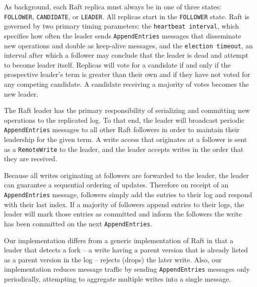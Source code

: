 \documentclass[10pt,conference,letterpaper]{IEEEtran}
\begin{document}
As background, each Raft replica must always be in one of three states: \texttt{FOLLOWER},
\texttt{CANDIDATE}, or \texttt{LEADER}.
All replicas start in the \texttt{FOLLOWER} state.
Raft is governed by two primary timing parameters: the \texttt{heartbeat interval}, which
specifies how often the leader sends \texttt{AppendEntries} messages that disseminate new
operations and double as 
keep-alive messages, and the \texttt{election timeout}, an interval after which a follower
may conclude that the leader is dead and attempt to become leader itself.
Replicas will vote for a candidate if and only if the prospective leader's term is greater
than their own and if they have not voted for any competing candidate.
A candidate receiving a majority of votes becomes the new leader.

The Raft leader has the primary responsibility of serializing and committing new
operations to the replicated log.
To that end, the leader will broadcast periodic \texttt{AppendEntries} messages to all
other Raft followers in order to maintain their leadership for the given term.
A write access that originates at a follower is sent as a \texttt{RemoteWrite} to the
leader, and the leader accepts writes in the order that they are received.

Because all writes originating at followers are forwarded to the leader, the leader can
guarantee a sequential ordering of updates.
Therefore on receipt of an \texttt{AppendEntries} message, followers simply add the
entries to their log and respond with their last index.
If a majority of followers append entries to their logs, the leader will mark those
entries as committed and inform the followers the write has been committed on the next
\texttt{AppendEntries}.

Our implementation differs from a generic implementation of Raft in that 
a leader that detects a
fork -- a write having a parent version that is already listed as a parent version in the
log -- rejects (drops) the later write.
Also, our implementation reduces message traffic by sending \texttt{AppendEntries}
messages only periodically, attempting to aggregate multiple writes into a single
message.

\end{document}
